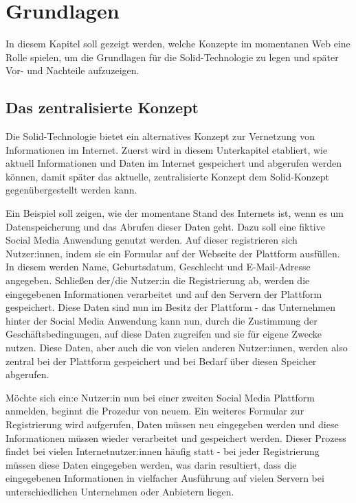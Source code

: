 \documentclass[acmtog]{acmart}
\begin{document}
\section{Grundlagen} \label{section:grundlagen}
In diesem Kapitel soll gezeigt werden, welche Konzepte im momentanen Web eine Rolle spielen, um die Grundlagen für die Solid-Technologie zu legen und später Vor- und Nachteile aufzuzeigen.

\subsection{Das zentralisierte Konzept} \label{section:zentralisiertesKonzept}

Die Solid-Technologie bietet ein alternatives Konzept zur Vernetzung von Informationen im Internet. Zuerst wird in diesem Unterkapitel etabliert, wie aktuell Informationen und Daten im Internet gespeichert und abgerufen werden können, damit später das aktuelle, zentralisierte Konzept dem Solid-Konzept gegenübergestellt werden kann.

Ein Beispiel soll zeigen, wie der momentane Stand des Internets ist, wenn es um Datenspeicherung und das Abrufen dieser Daten geht. Dazu soll eine fiktive Social Media Anwendung genutzt werden. Auf dieser registrieren sich Nutzer:innen, indem sie ein Formular auf der Webseite der Plattform ausfüllen. In diesem werden Name, Geburtsdatum, Geschlecht und E-Mail-Adresse angegeben. Schließen der/die Nutzer:in die Registrierung ab, werden die eingegebenen Informationen verarbeitet und auf den Servern der Plattform gespeichert. Diese Daten sind nun im Besitz der Plattform - das Unternehmen hinter der Social Media Anwendung kann nun, durch die Zustimmung der Geschäftsbedingungen, auf diese Daten zugreifen und sie für eigene Zwecke nutzen. Diese Daten, aber auch die von vielen anderen Nutzer:innen, werden also zentral bei der Plattform gespeichert und bei Bedarf über diesen Speicher abgerufen.  

Möchte sich ein:e Nutzer:in nun bei einer zweiten Social Media Plattform anmelden, beginnt die Prozedur von neuem. Ein weiteres Formular zur Registrierung wird aufgerufen, Daten müssen neu eingegeben werden und diese Informationen müssen wieder verarbeitet und gespeichert werden. Dieser Prozess findet bei vielen Internetnutzer:innen häufig statt - bei jeder Registrierung müssen diese Daten eingegeben werden, was darin resultiert, dass die eingegebenen Informationen in vielfacher Ausführung auf vielen Servern bei unterschiedlichen Unternehmen oder Anbietern liegen. 
\end{document}
